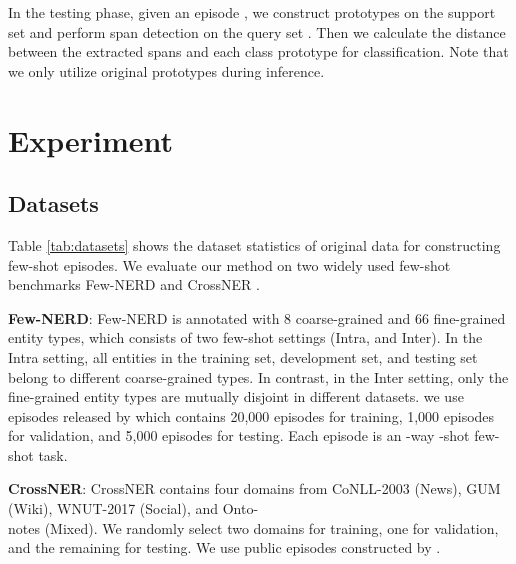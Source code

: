 \documentclass[sigconf,natbib=true,anonymous=False]{acmart}
\begin{document}
In the testing phase, given an episode , we construct prototypes on the support set  and perform span detection on the query set . Then we calculate the distance between the extracted spans and each class prototype for classification. Note that we only utilize original prototypes during inference.





















    




\section{Experiment}
\label{sec:page}

\subsection{Datasets}
Table \ref{tab:datasets} shows the dataset statistics of original data for constructing few-shot episodes.
We evaluate our method on two widely used few-shot benchmarks Few-NERD \cite{ding2021few} and CrossNER \cite{liu2021crossner}. 

\textbf{Few-NERD}: Few-NERD is annotated with 8 coarse-grained and 66 fine-grained entity types, which consists of two few-shot settings (Intra, and Inter). In the Intra setting, all entities in the training set, development set, and testing set belong to different coarse-grained types. In contrast, in the Inter setting, only the fine-grained entity types are mutually disjoint in different datasets. we use episodes released by \citeauthor{ding2021few} which contains 20,000 episodes for training, 1,000 episodes for validation, and 5,000 episodes for testing. Each episode is an -way -shot few-shot task. 


\textbf{CrossNER}: CrossNER contains four domains from CoNLL-2003 \cite{sang2003introduction}(News), GUM \cite{zeldes2017gum} (Wiki), WNUT-2017 \cite{derczynski2017results} (Social), and Onto-\\notes \cite{pradhan2013towards}(Mixed). We randomly select two domains for training, one for validation, and the remaining for testing. We use public episodes constructed by \citeauthor{hou2020few} .
\end{document}
